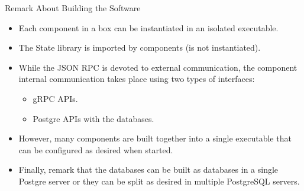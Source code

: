 \begin{frame}[fragile]{Remark About Building the Software}
\begin{itemize}
\item Each component in a box can be instantiated in an isolated executable.
\item The State library is imported by components (is not instantiated).
\item While the JSON RPC is devoted to external communication, 
the component internal communication takes place using two types of interfaces:
  \begin{itemize}
  \item gRPC APIs.
  \item Postgre APIs with the databases.
  \end{itemize}
\item However, many components are built together into a single executable that can 
be configured as desired when started.
\item Finally, remark that the databases can be built as databases in a single Postgre server or
they can be split as desired in multiple PostgreSQL servers.
\end{itemize}
\end{frame}